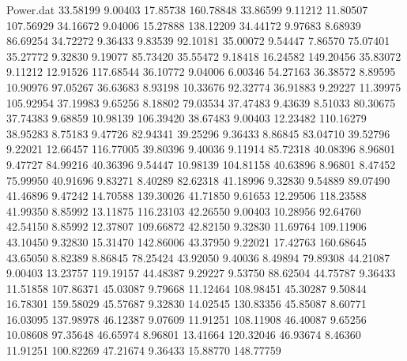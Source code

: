 \begin{filecontents}{Power.dat}
  33.58199    9.00403   17.85738  160.78848
  33.86599    9.11212   11.80507  107.56929
  34.16672    9.04006   15.27888  138.12209
  34.44172    9.97683    8.68939   86.69254
  34.72272    9.36433    9.83539   92.10181
  35.00072    9.54447    7.86570   75.07401
  35.27772    9.32830    9.19077   85.73420
  35.55472    9.18418   16.24582  149.20456
  35.83072    9.11212   12.91526  117.68544
  36.10772    9.04006    6.00346   54.27163
  36.38572    8.89595   10.90976   97.05267
  36.63683    8.93198   10.33676   92.32774
  36.91883    9.29227   11.39975  105.92954
  37.19983    9.65256    8.18802   79.03534
  37.47483    9.43639    8.51033   80.30675
  37.74383    9.68859   10.98139  106.39420
  38.67483    9.00403   12.23482  110.16279
  38.95283    8.75183    9.47726   82.94341
  39.25296    9.36433    8.86845   83.04710
  39.52796    9.22021   12.66457  116.77005
  39.80396    9.40036    9.11914   85.72318
  40.08396    8.96801    9.47727   84.99216
  40.36396    9.54447   10.98139  104.81158
  40.63896    8.96801    8.47452   75.99950
  40.91696    9.83271    8.40289   82.62318
  41.18996    9.32830    9.54889   89.07490
  41.46896    9.47242   14.70588  139.30026
  41.71850    9.61653   12.29506  118.23588
  41.99350    8.85992   13.11875  116.23103
  42.26550    9.00403   10.28956   92.64760
  42.54150    8.85992   12.37807  109.66872
  42.82150    9.32830   11.69764  109.11906
  43.10450    9.32830   15.31470  142.86006
  43.37950    9.22021   17.42763  160.68645
  43.65050    8.82389    8.86845   78.25424
  43.92050    9.40036    8.49894   79.89308
  44.21087    9.00403   13.23757  119.19157
  44.48387    9.29227    9.53750   88.62504
  44.75787    9.36433   11.51858  107.86371
  45.03087    9.79668   11.12464  108.98451
  45.30287    9.50844   16.78301  159.58029
  45.57687    9.32830   14.02545  130.83356
  45.85087    8.60771   16.03095  137.98978
  46.12387    9.07609   11.91251  108.11908
  46.40087    9.65256   10.08608   97.35648
  46.65974    8.96801   13.41664  120.32046
  46.93674    8.46360   11.91251  100.82269
  47.21674    9.36433   15.88770  148.77759
\end{filecontents}
